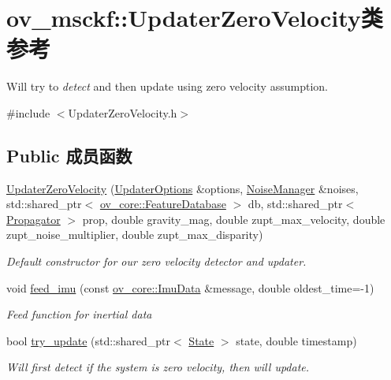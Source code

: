 \hypertarget{classov__msckf_1_1UpdaterZeroVelocity}{}\section{ov\+\_\+msckf\+:\+:Updater\+Zero\+Velocity类 参考}
\label{classov__msckf_1_1UpdaterZeroVelocity}


Will try to {\itshape detect} and then update using zero velocity assumption.  




{\ttfamily \#include $<$Updater\+Zero\+Velocity.\+h$>$}

\subsection*{Public 成员函数}
\begin{DoxyCompactItemize}
\item 
\hyperlink{classov__msckf_1_1UpdaterZeroVelocity_a1077d2767c078874ed48132ebaa9b975}{Updater\+Zero\+Velocity} (\hyperlink{structov__msckf_1_1UpdaterOptions}{Updater\+Options} \&options, \hyperlink{structov__msckf_1_1NoiseManager}{Noise\+Manager} \&noises, std\+::shared\+\_\+ptr$<$ \hyperlink{classov__core_1_1FeatureDatabase}{ov\+\_\+core\+::\+Feature\+Database} $>$ db, std\+::shared\+\_\+ptr$<$ \hyperlink{classov__msckf_1_1Propagator}{Propagator} $>$ prop, double gravity\+\_\+mag, double zupt\+\_\+max\+\_\+velocity, double zupt\+\_\+noise\+\_\+multiplier, double zupt\+\_\+max\+\_\+disparity)
\begin{DoxyCompactList}\small\item\em Default constructor for our zero velocity detector and updater. \end{DoxyCompactList}\item 
void \hyperlink{classov__msckf_1_1UpdaterZeroVelocity_a85e0ca4c3728853d6e12ae4ec9bf691d}{feed\+\_\+imu} (const \hyperlink{structov__core_1_1ImuData}{ov\+\_\+core\+::\+Imu\+Data} \&message, double oldest\+\_\+time=-\/1)
\begin{DoxyCompactList}\small\item\em Feed function for inertial data \end{DoxyCompactList}\item 
bool \hyperlink{classov__msckf_1_1UpdaterZeroVelocity_a703a198829da68f905280ce8af8aa9e6}{try\+\_\+update} (std\+::shared\+\_\+ptr$<$ \hyperlink{classov__msckf_1_1State}{State} $>$ state, double timestamp)
\begin{DoxyCompactList}\small\item\em Will first detect if the system is zero velocity, then will update. \end{DoxyCompactList}\end{DoxyCompactItemize}
